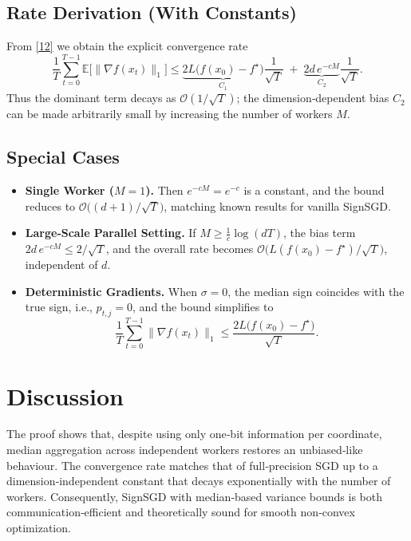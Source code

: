 \documentclass{article}
\newcommand{\E}{\mathbb{E}}
\begin{document}
\subsection*{Rate Derivation (With Constants)}
From \eqref{12} we obtain the explicit convergence rate
\[
\boxed{
\frac{1}{T}\sum_{t=0}^{T-1}\E\!\big[\|\nabla f(x_{t})\|_{1}\big]
\le
\underbrace{2L\big(f(x_{0})-f^{\star}\big)}_{\displaystyle C_{1}}
\frac{1}{\sqrt{T}}
\;+\;
\underbrace{2d\,e^{-cM}}_{\displaystyle C_{2}}\frac{1}{\sqrt{T}} }.
\]
Thus the dominant term decays as $\mathcal{O}(1/\sqrt{T})$; the
dimension‑dependent bias $C_{2}$ can be made arbitrarily small by increasing
the number of workers $M$.

\subsection*{Special Cases}
\begin{itemize}[leftmargin=*]
\item \textbf{Single Worker ($M=1$).}  Then $e^{-cM}=e^{-c}$ is a constant,
and the bound reduces to $\mathcal{O}\!\big((d+1)/\sqrt{T}\big)$, matching known
results for vanilla SignSGD.
\item \textbf{Large‑Scale Parallel Setting.}  If $M\ge \frac{1}{c}\log(dT)$,
the bias term $2d\,e^{-cM}\le 2/\sqrt{T}$, and the overall rate becomes
$\mathcal{O}\!\big(L(f(x_{0})-f^{\star})/\sqrt{T}\big)$, independent of $d$.
\item \textbf{Deterministic Gradients.}  When $\sigma=0$, the median sign
coincides with the true sign, i.e., $p_{t,j}=0$, and the bound simplifies to
\[
\frac{1}{T}\sum_{t=0}^{T-1}\|\nabla f(x_{t})\|_{1}
   \le \frac{2L\big(f(x_{0})-f^{\star}\big)}{\sqrt{T}}.
\]
\end{itemize}

\section*{Discussion}
The proof shows that, despite using only one‑bit information per coordinate,
median aggregation across independent workers restores an unbiased‑like
behaviour.  The convergence rate matches that of full‑precision SGD up to a
dimension‑independent constant that decays exponentially with the number of
workers.  Consequently, SignSGD with median‑based variance bounds is both
communication‑efficient and theoretically sound for smooth non‑convex
optimization.
\end{document}
